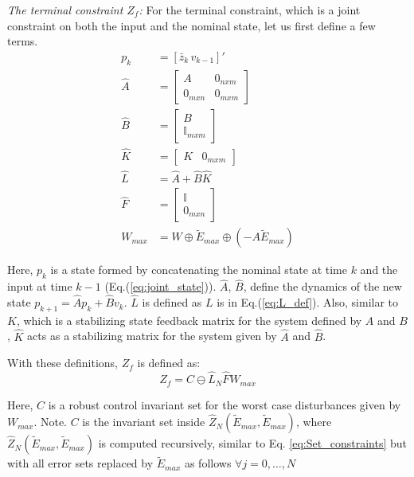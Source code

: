 \textit{The terminal constraint $Z_f$:}
For the terminal constraint, which is a joint constraint on both the input and the nominal state, let us first define a few terms.
\begin{subequations}
\begin{align}
p_k &=[\bar{z}_k \, v_{k-1}]' \label{eq:joint_state} \\
\hat{A} &= \begin{bmatrix} A & 0_{nxm} \\ 0_{mxn} & 0_{mxm}   \end{bmatrix} \label{eq:A_hat} \\
\hat{B} &= \begin{bmatrix}  B \\ \mathbb{I}_{mxm} \end{bmatrix} \label{eq:B_hat} \\
\hat{K} &= \begin{bmatrix}  K & 0_{mxm}  \end{bmatrix} \label{eq:K_hat} \\
\hat{L} &= \hat{A}+\hat{B}\hat{K} \label{eq:L_hat} \\
\hat{F} &= \begin{bmatrix} \mathbb{I} \\ 0_{mxn} \end{bmatrix} \\
W_{max} &= W \oplus \tilde{E}_{max} \oplus (-A\tilde{E}_{max}) \label{eq:W_max} 
\end{align}
\end{subequations}

Here, $p_k$ is a state formed by concatenating the nominal state at time $k$ and the input at time $k-1$ (Eq.(\ref{eq:joint_state})). $\hat{A}$, $\hat{B}$, define the dynamics of the new state $p_{k+1} = \hat{A}p_{k} + \hat{B}v_k$. $\hat{L}$ is defined as $L$ is in Eq.(\ref{eq:L_def}). Also, similar to $K$, which is a stabilizing state feedback matrix for the system defined by $A$ and $B$, $\hat{K}$ acts as a stabilizing matrix for the system given by $\hat{A}$ and $\hat{B}$.

With these definitions, $Z_f$ is defined as:
\begin{equation}
Z_f = C\ominus \hat{L}_N\hat{F}{W}_{max}
\end{equation}

Here, $C$ is a robust control invariant set for the worst case disturbances given by $W_{max}$. Note. $C$ is the invariant set inside $\hat{Z}_N(\tilde{E}_{max},\tilde{E}_{max})$, where $\hat{Z}_N(\tilde{E}_{max},\tilde{E}_{max})$ is computed recursively, similar to Eq. \ref{eq:Set_constraints} but with all error sets replaced by $\tilde{E}_{max}$ as follows $\forall j=0,\dotsc,N$


